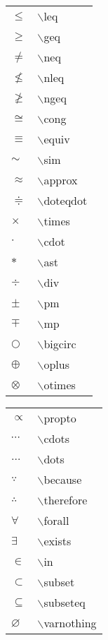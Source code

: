 \documentclass[report,oneside,UTF8,zihao=-4]{config}
\begin{document}
\begin{center}
    \begin{tabular}{ll}
    $\leq$ &  $\backslash$leq \\
    $\geq$ &  $\backslash$geq \\
    $\neq$ &  $\backslash$neq \\
    $\nleq$ &  $\backslash$nleq \\
    $\ngeq$ &  $\backslash$ngeq \\
    $\cong$ &  $\backslash$cong \\
    $\equiv$ &  $\backslash$equiv \\
    $\sim$ &  $\backslash$sim \\
    $\approx$ &  $\backslash$approx \\
    $\doteqdot$ &  $\backslash$doteqdot \\
    $\times$ &  $\backslash$times \\
    $\cdot $ &  $\backslash$cdot \\
    $\ast $ &  $\backslash$ast \\
    $\div$ &  $\backslash$div \\
    $\pm$ &  $\backslash$pm \\
    $\mp$ &  $\backslash$mp \\
    $\bigcirc$ &  $\backslash$bigcirc \\
    $\oplus$ &  $\backslash$oplus \\
    $\otimes$ &  $\backslash$otimes \\
    \end{tabular}
    \hspace*{1ex}
    \begin{tabular}{ll}
    $\propto $ &  $\backslash$propto \\
    $\cdots $ &  $\backslash$cdots \\
    $\dots $ &  $\backslash$dots \\
    $\because$ &  $\backslash$because \\
    $\therefore$ &  $\backslash$therefore \\
    $\forall$ &  $\backslash$forall \\
    $\exists$ &  $\backslash$exists \\
    $\in$ &  $\backslash$in \\
    $\subset $ &  $\backslash$subset \\
    $\subseteq $ &  $\backslash$subseteq \\
    $\varnothing $ &  $\backslash$varnothing  \\

\end{tabular}
\end{center}
\end{document}
